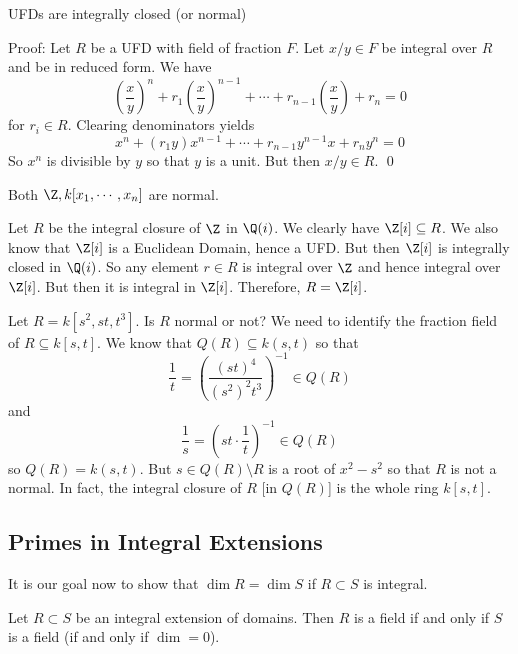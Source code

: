 \begin{prop}
UFDs are integrally closed (or normal)
\end{prop}

\noindent Proof: Let $R$ be a UFD with field of fraction $F$. Let $x/y \in F$ be integral over $R$ and be in reduced form. We have
\[
\left(\frac{x}{y}\right)^n+r_1\left(\frac{x}{y}\right)^{n-1}+\cdots+r_{n-1}\left(\frac{x}{y}\right)+r_n=0
\]
for $r_i \in R$. Clearing denominators yields
\[
x^n+(r_1y)x^{n-1}+\cdots+r_{n-1}y^{n-1}x+r_ny^n=0
\]
So $x^n$ is divisible by $y$ so that $y$ is a unit. But then $x/y \in R$. \qed \\

\begin{ex}
Both $\Z,k[x_1,\cdots,x_n]$ are normal. 
\end{ex}

\begin{ex}
Let $R$ be the integral closure of $\Z$ in $\Q(i)$. We clearly have $\Z[i] \subseteq R$. We also know that $\Z[i]$ is a Euclidean Domain, hence a UFD. But then $\Z[i]$ is integrally closed in $\Q(i)$. So any element $r \in R$ is integral over $\Z$ and hence integral over $\Z[i]$. But then it is integral in $\Z[i]$. Therefore, $R=\Z[i]$. 
\end{ex}

\begin{ex}
Let $R=k[s^2,st,t^3]$. Is $R$ normal or not? We need to identify the fraction field of $R \subseteq k[s,t]$. We know that $Q(R)\subseteq k(s,t)$ so that 
\[
\frac{1}{t}= \left( \frac{(st)^4}{(s^2)^2t^3} \right)^{-1} \in Q(R)
\]
and 
\[
\frac{1}{s}=\left( st \cdot \frac{1}{t} \right)^{-1} \in Q(R)
\]
so $Q(R)=k(s,t)$. But $s \in Q(R) \setminus R$ is a root of $x^2-s^2$ so that $R$ is not a normal. In fact, the integral closure of $R$ [in $Q(R)$] is the whole ring $k[s,t]$. 
\end{ex}

\subsection{Primes in Integral Extensions}

It is our goal now to show that $\dim R=\dim S$ if $R \subset S$ is integral. 

\begin{lem}
Let $R \subset S$ be an integral extension of domains. Then $R$ is a field if and only if $S$ is a field (if and only if $\dim =0$). 
\end{lem}

